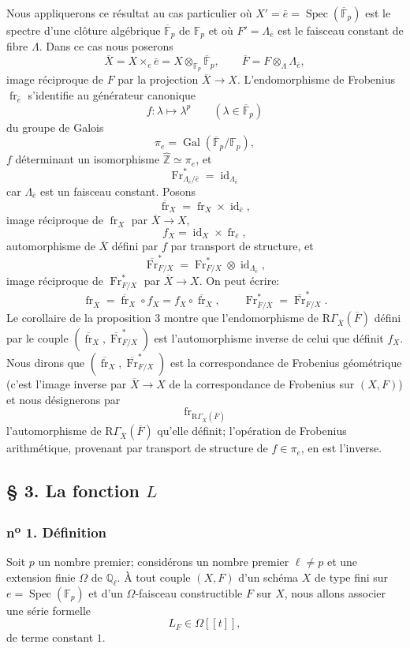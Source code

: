 \documentclass[11pt]{article}
\DeclareMathOperator{\Spec}{Spec}
\newcommand{\R}{\mathrm{R}}\newcommand{\RHomCore}{\mathrm{RHom}}
\providecommand{\Gal}{\operatorname{Gal}}
\providecommand{\RGamma}{\R\Gamma}
\providecommand{\id}{\operatorname{id}}
\providecommand{\id}{\operatorname{id}}
\providecommand{\id}{\operatorname{id}}
\providecommand{\RGamma}{\R\Gamma}
\providecommand{\R}{\mathrm R}
\providecommand{\id}{\operatorname{id}}
\providecommand{\Spec}{\operatorname{Spec}}
\providecommand{\Spec}{\operatorname{Spec}}
\providecommand{\id}{\operatorname{id}}
\providecommand{\Spec}{\operatorname{Spec}}
\providecommand{\fr}{\operatorname{fr}}
\providecommand{\Fr}{\operatorname{Fr}}
\providecommand{\Fr}{\operatorname{Fr}}
\providecommand{\fr}{\operatorname{fr}}
\providecommand{\Spec}{\operatorname{Spec}}
\providecommand{\id}{\operatorname{id}}
\providecommand{\RGamma}{\R\Gamma}
\providecommand{\Gal}{\operatorname{Gal}}
\begin{document}
Nous appliquerons ce résultat au cas particulier où $X'=\bar e=\Spec(\overline{\mathbb F}_p)$ est le spectre d'une clôture algébrique $\overline{\mathbb F}_p$ de $\mathbb F_p$ et où $F'=\Lambda_{\bar e}$ est le faisceau constant de fibre $\Lambda$. Dans ce cas nous poserons
\[
\overline X=X\times_e\bar e=X\otimes_{\mathbb F_p}\overline{\mathbb F}_p,
\qquad
\overline F=F\otimes_\Lambda\Lambda_{\bar e},
\]
image réciproque de $F$ par la projection $\overline X\to X$. L'endomorphisme de Frobenius $\fr_{\bar e}$ s'identifie au générateur canonique
\[
f:\lambda\longmapsto\lambda^p\qquad(\lambda\in\overline{\mathbb F}_p)
\]
du groupe de Galois
\[
\pi_e=\Gal(\overline{\mathbb F}_p/\mathbb F_p),
\]
$f$ déterminant un isomorphisme $\widehat{\mathbb Z}\simeq\pi_e$, et
\[
\Fr^*_{\Lambda_{\bar e}/\bar e}=\id_{\Lambda_{\bar e}}
\]
car $\Lambda_{\bar e}$ est un faisceau constant. Posons
\[
\overline{\fr}_X=\fr_X\times\id_{\bar e},
\]
image réciproque de $\fr_X$ par $\overline X\to X$,
\[
f_X=\id_X\times\fr_{\bar e},
\]
automorphisme de $\overline X$ défini par $f$ par transport de structure, et
\[
\overline{\Fr}^*_{F/X}=\Fr^*_{F/X}\otimes\id_{\Lambda_{\bar e}},
\]
image réciproque de $\Fr^*_{F/X}$ par $\overline X\to X$. On peut écrire:
\[
\fr_{\overline X}=\overline{\fr}_X\circ f_X=f_X\circ\overline{\fr}_X,
\qquad
\Fr^*_{\overline F/\overline X}=\overline{\Fr}^*_{F/X}.
\]
Le corollaire de la proposition 3 montre que l'endomorphisme de $\RGamma_{\overline X}(\overline F)$ défini par le couple $(\overline{\fr}_X,\overline{\Fr}^*_{F/X})$ est l'automorphisme inverse de celui que définit $f_X$. Nous dirons que $(\overline{\fr}_X,\overline{\Fr}^*_{F/X})$ est la correspondance de Frobenius géométrique (c'est l'image inverse par $\overline X\to X$ de la correspondance de Frobenius sur $(X,F)$) et nous désignerons par
\[
\fr_{\RGamma_{\overline X}(\overline F)}
\]
l'automorphisme de $\RGamma_{\overline X}(\overline F)$ qu'elle définit; l'opération de Frobenius arithmétique, provenant par transport de structure de $f\in\pi_e$, en est l'inverse.

\subsection*{§ 3. La fonction $L$}

\subsubsection*{n\textsuperscript{o} 1. Définition}

Soit $p$ un nombre premier; considérons un nombre premier $\ell\ne p$ et une extension finie $\Omega$ de $\mathbb Q_\ell$. À tout couple $(X,F)$ d'un schéma $X$ de type fini sur $e=\Spec(\mathbb F_p)$ et d'un $\Omega$-faisceau constructible $F$ sur $X$, nous allons associer une série formelle
\[
L_F\in\Omega[[t]],
\]
de terme constant $1$.
\end{document}
